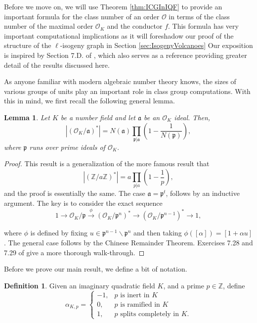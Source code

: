 \documentclass{amsart}
\newtheorem{lem}[thm]{Lemma}
\theoremstyle{definition}
\newtheorem{definition}[thm]{Definition}
\theoremstyle{remark}
\numberwithin{equation}{section}
\newcommand{\cO}{\mathcal O}
\newcommand{\fka}{\mathfrak a}
\newcommand{\fkp}{\mathfrak p}
\newcommand{\bbZ}{\mathbb Z}
\begin{document}
Before we move on, we will use Theorem \ref{thm:ICGInIQF} to provide an important formula for the class number of an order $\cO$ in terms of the class number of the maximal order $\cO_{K}$ and the conductor $f$. This formula has very important computational implications as it will foreshadow our proof of the structure of the $\ell$-isogeny graph in Section \ref{sec:IsogenyVolcanoes} 
Our exposition is inspired by Section 7.D. of \cite{CoxPrimes}, which also serves as a reference providing greater detail of the results discussed here.

 As anyone familiar with modern algebraic number theory knows, the sizes of various groups of units play an important role in class group computations. With this in mind, we first recall the following general lemma.
 
 \begin{lem} \label{lem:UnitsQuotientByIdeal}
 Let $K$ be a number field and let $\fka$ be an $\cO_{K}$ ideal. Then,
 \[
 |(\cO_{K}/\fka)^*| = N(\fka) \prod_{\fkp|\fka}\left(1 - \frac{1}{N(\fkp)}\right),
 \]
 where $\fkp$ runs over prime ideals of $\cO_{K}$.
 \end{lem}
 
 \begin{proof}
 This result is a generalization of the more famous result that 
 \[
 |(\bbZ/a\bbZ)^*| = a \prod_{p|a}\left(1 - \frac{1}{p}\right),
 \]
 and the proof is essentially the same. The case $\fka = \fkp^{t}$, follows by an inductive argument. The key is to consider the exact sequence
 \[
 1 \to \cO_{K}/\fkp \overset{\phi}{\to} (\cO_{K}/\fkp^n)^* \to (\cO_{K}/\fkp^{n-1})^* \to 1,
 \]

where $\phi$ is defined by fixing $u \in \fkp^{n-1}\smallsetminus \fkp^{n}$ and then taking $\phi([\alpha]) = [1 + \alpha u]$. The general case follows by the Chinese Remainder Theorem. Exercises 7.28 and 7.29 of \cite{CoxPrimes} give a more thorough walk-through.
 \end{proof}

Before we prove our main result, we define a bit of notation.

\begin{definition} \label{def:KroneckerSymbol}
Given an imaginary quadratic field $K$, and a prime $p \in \bbZ$, define
\[
\alpha_{K,p} = 
\begin{cases}
-1, & p \text{ is inert in } K\\
0, & p \text{ is ramified in } K\\
1, & p \text{ splits completely in } K.
\end{cases}
\]
\end{definition}
\end{document}
